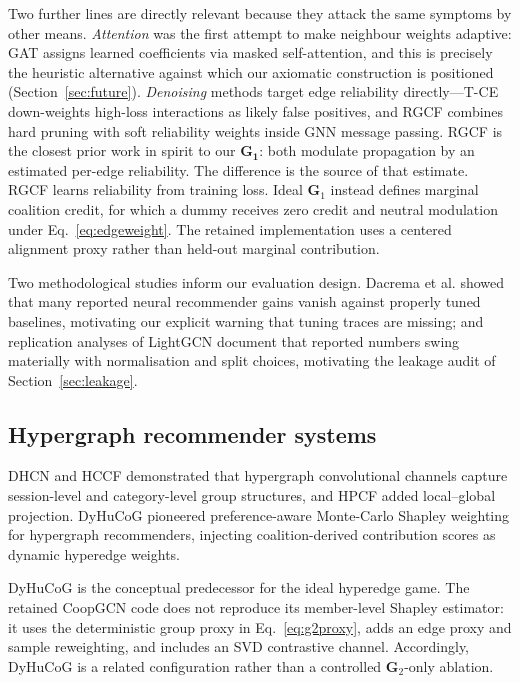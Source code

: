\documentclass[a4paper,fleqn,longmktitle]{cas-dc}
\begin{document}
Two further lines are directly relevant because they attack the same symptoms
by other means. \emph{Attention} was the first attempt to make neighbour
weights adaptive: GAT \citep{velickovic2018gat} assigns learned coefficients
via masked self-attention, and this is precisely the heuristic alternative
against which our axiomatic construction is positioned
(Section~\ref{sec:future}). \emph{Denoising} methods target edge reliability
directly---T-CE \citep{wang2021denoising} down-weights high-loss interactions
as likely false positives, and RGCF \citep{tian2022rgcf} combines hard pruning
with soft reliability weights inside GNN message passing. RGCF is the closest
prior work in spirit to our $\mathbf{G_1}$: both modulate propagation by an
estimated per-edge reliability. The difference is the source of that estimate.
RGCF learns reliability from training loss. Ideal $\mathbf G_1$ instead defines
marginal coalition credit, for which a dummy receives zero credit and neutral
modulation under Eq.~\eqref{eq:edgeweight}. The retained implementation uses a
centered alignment proxy rather than held-out marginal contribution.

Two methodological studies inform our evaluation design. Dacrema et al.
\citep{dacrema2019worrying} showed that many reported neural recommender gains
vanish against properly tuned baselines, motivating our explicit warning that
tuning traces are missing; and replication analyses of LightGCN \citep{peska2023lightgcn}
document that reported numbers swing materially with normalisation and split
choices, motivating the leakage audit of Section~\ref{sec:leakage}.

\subsection{Hypergraph recommender systems}
\label{sec:rw-hyper}

DHCN \citep{xia2021dhcn} and HCCF \citep{xia2022hccf} demonstrated that
hypergraph convolutional channels capture session-level and category-level
group structures, and HPCF \citep{chen2024hpcf} added local--global projection.
DyHuCoG \citep{louhichi2026dyhucog} pioneered preference-aware Monte-Carlo
Shapley weighting for hypergraph recommenders, injecting coalition-derived
contribution scores as dynamic hyperedge weights.

DyHuCoG is the conceptual predecessor for the ideal hyperedge game. The
retained CoopGCN code does not reproduce its member-level Shapley estimator:
it uses the deterministic group proxy in Eq.~\eqref{eq:g2proxy}, adds an edge
proxy and sample reweighting, and includes an SVD contrastive channel.
Accordingly, DyHuCoG is a related configuration rather than a controlled
$\mathbf G_2$-only ablation.
\end{document}
